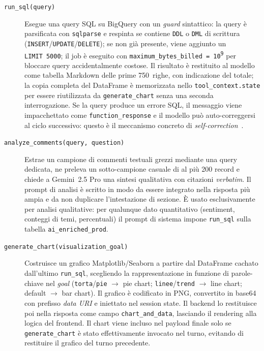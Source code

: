 \begin{description}
  \item[\texttt{run\_sql(query)}]
    Esegue una query SQL su BigQuery con un \emph{guard} sintattico: la
    query è parsificata con \texttt{sqlparse} e respinta se contiene
    \texttt{DDL} o \texttt{DML} di scrittura
    (\texttt{INSERT}/\texttt{UPDATE}/\texttt{DELETE}); se non già
    presente, viene aggiunto un \texttt{LIMIT~5000}; il job è eseguito
    con \texttt{maximum\_bytes\_billed = 10\textsuperscript{9}} per
    bloccare query accidentalmente costose. Il risultato è restituito
    al modello come tabella Markdown delle prime 750~righe, con
    indicazione del totale; la copia completa del DataFrame è
    memorizzata nello \texttt{tool\_context.state} per essere
    riutilizzata da \texttt{generate\_chart} senza una seconda
    interrogazione. Se la query produce un errore SQL, il messaggio
    viene impacchettato come \texttt{function\_response} e il modello
    può auto-correggersi al ciclo successivo: questo è il meccanismo
    concreto di \emph{self-correction}~\cite{pourreza2023dinsql}.
  \item[\texttt{analyze\_comments(query, question)}]
    Estrae un campione di commenti testuali grezzi mediante una query
    dedicata, ne preleva un sotto-campione casuale di al più 200 record
    e chiede a Gemini~2.5 Pro una sintesi qualitativa con citazioni
    \emph{verbatim}. Il prompt di analisi è scritto in modo da essere
    integrato nella risposta più ampia e da non duplicare l'intestazione
    di sezione. È usato esclusivamente per analisi qualitative: per
    qualunque dato quantitativo (sentiment, conteggi di temi, percentuali)
    il prompt di sistema impone \texttt{run\_sql} sulla tabella
    \texttt{ai\_enriched\_prod}.
  \item[\texttt{generate\_chart(visualization\_goal)}]
    Costruisce un grafico Matplotlib/Seaborn a partire dal DataFrame
    cachato dall'ultimo \texttt{run\_sql}, scegliendo la rappresentazione
    in funzione di parole-chiave nel \emph{goal}
    (\texttt{torta}/\texttt{pie} $\rightarrow$ pie chart;
    \texttt{linee}/\texttt{trend} $\rightarrow$ line chart; default
    $\rightarrow$ bar chart). Il grafico è codificato in PNG, convertito
    in base64 con prefisso \emph{data URI} e iniettato nel session state.
    Il backend lo restituisce poi nella risposta come campo
    \texttt{chart\_and\_data}, lasciando il rendering alla logica del
    frontend. Il chart viene incluso nel payload finale solo se
    \texttt{generate\_chart} è stato effettivamente invocato nel turno,
    evitando di restituire il grafico del turno precedente.
\end{description}

